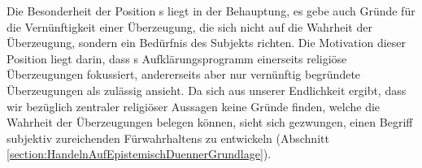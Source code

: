 Die Besonderheit der Position s liegt in der
Behauptung, es gebe auch Gründe für die Vernünftigkeit einer Überzeugung, die sich nicht auf
die Wahrheit der Überzeugung, sondern ein Bedürfnis des Subjekts richten. Die
Motivation dieser Position liegt darin, dass s
Aufklärungsprogramm einerseits religiöse Überzeugungen fokussiert, andererseits
aber nur vernünftig begründete Überzeugungen als zulässig ansieht. Da sich aus
unserer Endlichkeit ergibt, dass wir bezüglich zentraler religiöser Aussagen
keine Gründe finden, welche die Wahrheit der Überzeugungen belegen können, sieht
sich  gezwungen, einen Begriff subjektiv zureichenden
Fürwahrhaltens zu entwickeln (Abschnitt
\ref{section:HandelnAufEpistemischDuennerGrundlage}).

